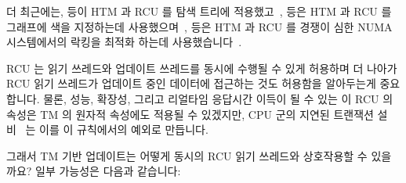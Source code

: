 \fi

더 최근에는,  등이 HTM 과 RCU 를 탐색 트리에
적용했고~\cite{Siakavaras2017CombiningHA,DimitriosSiakavaras2020RCU-HTM-B+Trees},
 등은 HTM 과 RCU 를 그래프에 색을 지정하는데
사용했으며~\cite{ChristinaGiannoula2018HTM-RCU-graphcoloring},
 등은 HTM 과 RCU 를 경쟁이 심한 NUMA 시스템에서의 락킹을
최적화 하는데 사용했습니다~\cite{SeongJaePark2020HTMRCUlock}.

RCU 는 읽기 쓰레드와 업데이트 쓰레드를 동시에 수행될 수 있게 허용하며 더 나아가
RCU 읽기 쓰레드가 업데이트 중인 데이터에 접근하는 것도 허용함을 알아두는게
중요합니다.
물론, 성능, 확장성, 그리고 리얼타임 응답시간 이득이 될 수 있는 이 RCU 의 속성은
TM 의 원자적 속성에도 적용될 수 있겠지만,  CPU 군의 지연된 트랜잭션
설비~\cite{Le:2015:TMS:3266491.3266500} 는 이를 이 규칙에서의 예외로 만듭니다.

그래서 TM 기반 업데이트는 어떻게 동시의 RCU 읽기 쓰레드와 상호작용할 수
있을까요?
일부 가능성은 다음과 같습니다:

